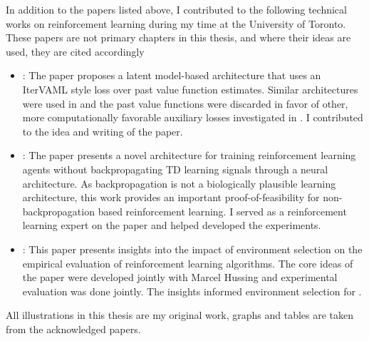 In addition to the papers listed above, I contributed to the following technical works on reinforcement learning during my time at the University of Toronto. These papers are not primary chapters in this thesis, and where their ideas are used, they are cited accordingly
\begin{itemize}
	\item {}: The paper proposes a latent model-based architecture that uses an IterVAML \parencite{itervaml} style loss over past value function estimates. Similar architectures were used in \textcite{voelcker2023lambda,voelcker2025mad,voelcker2025calibrated} and the past value functions were discarded in favor of other, more computationally favorable auxiliary losses investigated in \textcite{voelcker2024when}.
	I contributed to the idea and writing of the paper.
	\item {}: The paper presents a novel architecture for training reinforcement learning agents without backpropagating TD learning signals through a neural architecture.
	As backpropagation is not a biologically plausible learning architecture, this work provides an important proof-of-feasibility for non-backpropagation based reinforcement learning.
    I served as a reinforcement learning expert on the paper and helped developed the experiments.
	\item {}: This paper presents insights into the impact of environment selection on the empirical evaluation of reinforcement learning algorithms.
	The core ideas of the paper were developed jointly with Marcel Hussing and experimental evaluation was done jointly.
    The insights informed environment selection for \textcite{voelcker2025mad}.
\end{itemize}

All illustrations in this thesis are my original work, graphs and tables are taken from the acknowledged papers.